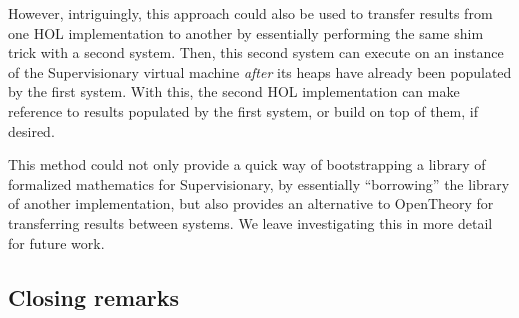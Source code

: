 \documentclass[a4paper, UKenglish, cleveref, autoref, thm-restate, colorlinks]{lipics-v2021}
\begin{document}
However, intriguingly, this approach could also be used to transfer results from one HOL implementation to another by essentially performing the same shim trick with a second system.
Then, this second system can execute on an instance of the Supervisionary virtual machine \emph{after} its heaps have already been populated by the first system.
With this, the second HOL implementation can make reference to results populated by the first system, or build on top of them, if desired.

This method could not only provide a quick way of bootstrapping a library of formalized mathematics for Supervisionary, by essentially ``borrowing'' the library of another implementation, but also provides an alternative to OpenTheory for transferring results between systems.
We leave investigating this in more detail for future work.

\subsection{Closing remarks}


\end{document}
